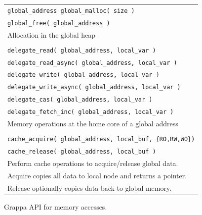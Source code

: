 \begin{figure}[htbp]
  \begin{center}
    \begin{minipage}{\columnwidth}
	\small
	\begin{tabular}{l}
      	\texttt{\scriptsize global\_address global\_malloc( size )} \\
      	\texttt{\scriptsize global\_free( global\_address )} \\ 
      	Allocation in the global heap \\ \\
      	\texttt{\scriptsize delegate\_read( global\_address, local\_var )}  \\
      	\texttt{\scriptsize delegate\_read\_async( global\_address, local\_var )}  \\
      	\texttt{\scriptsize delegate\_write( global\_address, local\_var )} \\
      	\texttt{\scriptsize delegate\_write\_async( global\_address, local\_var )} \\
      	\texttt{\scriptsize delegate\_cas( global\_address, local\_var )} \\
      	\texttt{\scriptsize delegate\_fetch\_inc( global\_address, local\_var )} \\ 
      	Memory operations at the home core of a global address \\ \\
      	\texttt{\scriptsize cache\_acquire( global\_address, local\_buf, \{RO,RW,WO\})} \\
      	\texttt{\scriptsize cache\_release( global\_address, local\_buf )} \\ 
		Perform cache operations to acquire/release global data.  \\
		Acquire copies all data to local node and returns a pointer. \\ 	
		Release optionally copies data back to global memory. \\
	\end{tabular}
      \caption{\label{fig:accessing-memory} Grappa API for memory accesses. }     \end{minipage}
  \end{center}
\end{figure}

